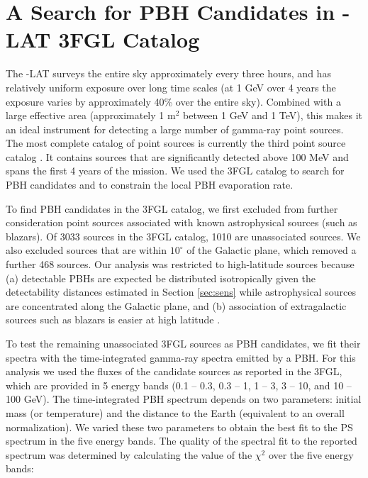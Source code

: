 \section{A Search for PBH Candidates in \Fermi-LAT 3FGL Catalog}
\label{sec:search}
The \Fermi-LAT surveys the entire sky approximately every three hours, and has relatively uniform exposure over long time scales (at 1 GeV over 4 years the exposure varies by approximately 40\% over the entire sky). Combined with a large effective area (approximately 1 m$^2$ between 1 GeV and 1 TeV), this makes it an ideal instrument for detecting a large number of gamma-ray point sources. 
The most complete catalog of point sources is currently the third \Fermi point source catalog  \citep[3FGL, ][]{2015ApJS..218...23A}. 
It contains sources that are significantly detected above 100 MeV and spans the first 4 years of the \Fermi mission. 
We used the 3FGL catalog to search for PBH candidates and to constrain the local PBH evaporation rate.

To find PBH candidates in the 3FGL catalog, we first excluded from further consideration point sources associated with known astrophysical sources (such as blazars). Of 3033 sources in the 3FGL catalog, 1010 are unassociated sources. We also excluded sources that are within $10^\circ$ of the Galactic plane, which removed a further 468 sources. Our analysis was restricted to high-latitude sources because (a) detectable PBHs are expected be distributed isotropically given the detectability distances estimated in Section \ref{sec:sens} while astrophysical sources are concentrated along the Galactic plane, and (b) association of extragalactic sources such as blazars is easier at high latitude 
\citep[see, e.g.][]{2015ApJ...810...14A}.

To test the remaining unassociated 3FGL sources as PBH candidates, we fit their spectra with the time-integrated gamma-ray spectra emitted by a PBH.
For this analysis we used the fluxes of the candidate sources as reported in the 3FGL, which are provided in 5 energy bands (0.1 -- 0.3, 0.3 -- 1, 1 -- 3, 3 -- 10, and 10 -- 100 GeV). The time-integrated PBH spectrum depends on two parameters: initial mass (or temperature) and the distance to the Earth (equivalent to an overall normalization).
We varied these two parameters to obtain the best fit to the PS spectrum in the five energy bands. The quality of the spectral fit to the reported spectrum was determined by calculating the value of the $\chi ^2$ over the five energy bands:

